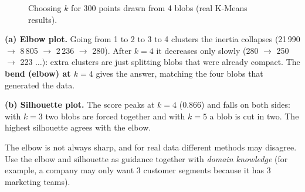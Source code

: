 \begin{figure}[!htbp]
\centering
{}
\caption{Choosing $k$ for 300 points drawn from 4 blobs (real K-Means results).}\label{fig:elbow}
\end{figure}

\begin{explain}
\textbf{(a) Elbow plot.} Going from 1 to 2 to 3 to 4 clusters the inertia collapses (21\,990 $\to$ 8\,805 $\to$ 2\,236 $\to$ 280). After $k=4$ it decreases only slowly (280 $\to$ 250 $\to$ 223 $\ldots$): extra clusters are just splitting blobs that were already compact. The \textbf{bend (elbow) at $k=4$} gives the answer, matching the four blobs that generated the data.

\medskip
\textbf{(b) Silhouette plot.} The score peaks at $k=4$ ($0.866$) and falls on both sides: with $k=3$ two blobs are forced together and with $k=5$ a blob is cut in two. The highest silhouette agrees with the elbow.
\end{explain}

\begin{warning}
The elbow is not always sharp, and for real data different methods may disagree. Use the elbow and silhouette as guidance together with \emph{domain knowledge} (for example, a company may only want 3 customer segments because it has 3 marketing teams).
\end{warning}

